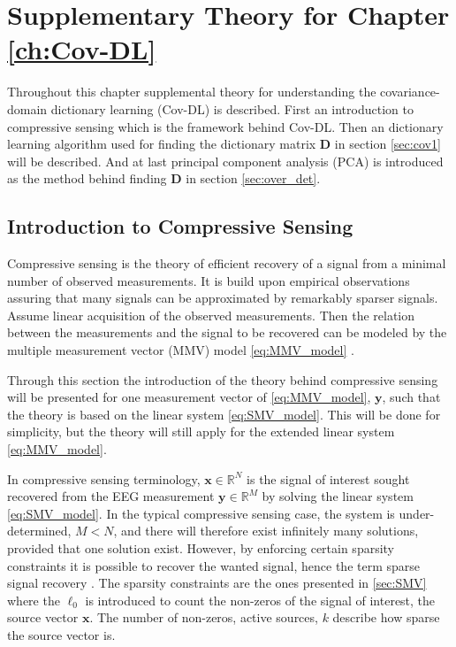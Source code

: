 \chapter{Supplementary Theory for Chapter \ref{ch:Cov-DL}}\label{app:Cov-DL}
Throughout this chapter supplemental theory for understanding the covariance-domain dictionary learning (Cov-DL) is described. First an introduction to compressive sensing which is the framework behind Cov-DL. Then an dictionary learning algorithm used for finding the dictionary matrix $\mathbf{D}$ in section \ref{sec:cov1} will be described. And at last principal component analysis (PCA) is introduced as the method behind finding $\mathbf{D}$ in section \ref{sec:over_det}.

\section{Introduction to Compressive Sensing}\label{app_sec:CS}
Compressive sensing is the theory of efficient recovery of a signal from a minimal number of observed measurements. 
It is build upon empirical observations assuring that many signals can be approximated by remarkably sparser signals. 
Assume linear acquisition of the observed measurements. 
Then the relation between the measurements and the signal to be recovered can be modeled by the multiple measurement vector (MMV) model \eqref{eq:MMV_model} \cite{FR}. 

Through this section the introduction of the theory behind compressive sensing will be presented for one measurement vector of \eqref{eq:MMV_model}, $\mathbf{y}$, such that the theory is based on the linear system \eqref{eq:SMV_model}. This will be done for simplicity, but the theory will still apply for the extended linear system \eqref{eq:MMV_model}.

In compressive sensing terminology, $\mathbf{x} \in \mathbb{R}^N$ is the signal of interest sought recovered from the EEG measurement $\mathbf{y} \in \mathbb{R}^M$ by solving the linear system \eqref{eq:SMV_model}. 
In the typical compressive sensing case, the system is under-determined, $M < N$, and there will therefore exist infinitely many solutions, provided that one solution exist.
However, by enforcing certain sparsity constraints it is possible to recover the wanted signal, hence the term sparse signal recovery \cite{FR}. 
The sparsity constraints are the ones presented in \ref{sec:SMV} where the $\ell_0$ is introduced to count the non-zeros of the signal of interest, the source vector $\mathbf{x}$. 
The number of non-zeros, active sources, $k$ describe how sparse the source vector is.
 
